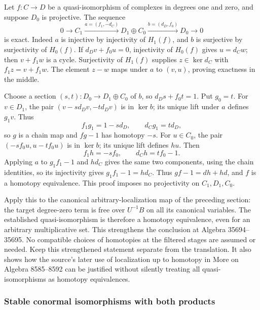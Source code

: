 Let \(f:C\to D\) be a quasi-isomorphism of complexes in degrees one and zero, and suppose \(D_0\) is projective. The sequence \[
0\to C_1\xrightarrow{a=(f_1,-d_C)}D_1\oplus C_0
\xrightarrow{b=(d_D,f_0)}D_0\to0\tag{6}
\] is exact. Indeed \(a\) is injective by injectivity of \(H_1(f)\), and \(b\) is surjective by surjectivity of \(H_0(f)\). If \(d_Dv+f_0u=0\), injectivity of \(H_0(f)\) gives \(u=d_Cw\); then \(v+f_1w\) is a cycle. Surjectivity of \(H_1(f)\) supplies \(z\in\ker d_C\) with \(f_1z=v+f_1w\). The element \(z-w\) maps under \(a\) to \((v,u)\), proving exactness in the middle.

Choose a section \((s,t):D_0\to D_1\oplus C_0\) of \(b\), so \(d_Ds+f_0t=1\). Put \(g_0=t\). For \(v\in D_1\), the pair \((v-sd_Dv,-td_Dv)\) is in \(\ker b\); its unique lift under \(a\) defines \(g_1v\). Thus \[
f_1g_1=1-sd_D,\qquad d_Cg_1=td_D,
\] so \(g\) is a chain map and \(fg-1\) has homotopy \(-s\). For \(u\in C_0\), the pair \((-sf_0u,u-tf_0u)\) is in \(\ker b\); its unique lift defines \(hu\). Then \[
f_1h=-sf_0,\qquad d_Ch=tf_0-1.
\] Applying \(a\) to \(g_1f_1-1\) and \(hd_C\) gives the same two components, using the chain identities, so its injectivity gives \(g_1f_1-1=hd_C\). Thus \(gf-1=dh+hd\), and \(f\) is a homotopy equivalence. This proof imposes no projectivity on \(C_1,D_1,C_0\).

Apply this to the canonical arbitrary-localization map of the preceding section: the target degree-zero term is free over \(U^{-1}B\) on all its canonical variables. The established quasi-isomorphism is therefore a homotopy equivalence, even for an arbitrary multiplicative set. This strengthens the conclusion at Algebra 35694--35695. No compatible choices of homotopies at the filtered stages are assumed or needed. Keep this strengthened statement separate from the translation. It also shows how the source's later use of localization up to homotopy in More on Algebra 8585--8592 can be justified without silently treating all quasi-isomorphisms as homotopy equivalences.

\subsubsection{Stable conormal isomorphisms with both products}\label{stable-conormal-isomorphisms-with-both-products}

